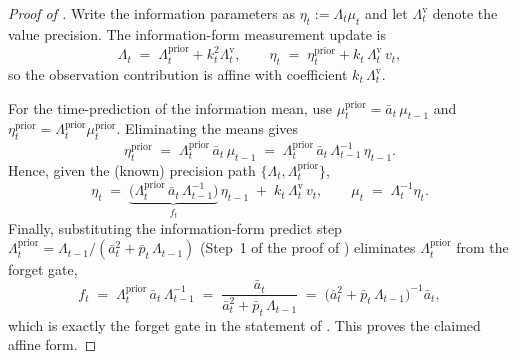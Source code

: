 \documentclass{article}
\begin{document}
\ThMeanAffine*
\begin{mdframed}
\begin{proof}[Proof of ]
Write the information parameters as $\eta_t := \Lambda_t \mu_t$ and let
$\Lambda_t^{\mathrm{v}}$ denote the value precision. The information-form measurement update is
\[
\Lambda_t \;=\; \Lambda_t^{\mathrm{prior}} + k_t^2 \Lambda_t^{\mathrm{v}},
\qquad
\eta_t \;=\; \eta_t^{\mathrm{prior}} + k_t\,\Lambda_t^{\mathrm{v}}\,v_t,
\]
so the observation contribution is affine with coefficient $k_t\,\Lambda_t^{\mathrm{v}}$.

For the time-prediction of the information mean, use $\mu_t^{\mathrm{prior}} = \bar{a}_t\,\mu_{t-1}$ and
$\eta_t^{\mathrm{prior}} = \Lambda_t^{\mathrm{prior}} \mu_t^{\mathrm{prior}}$. Eliminating the means gives
\[
\eta_t^{\mathrm{prior}} \;=\; \Lambda_t^{\mathrm{prior}}\, \bar{a}_t\, \mu_{t-1}
\;=\; \Lambda_t^{\mathrm{prior}}\, \bar{a}_t\, \Lambda_{t-1}^{-1}\,\eta_{t-1}.
\]
Hence, given the (known) precision path $\{\Lambda_t, \Lambda_t^{\mathrm{prior}}\}$,
\[
\eta_t \;=\; \underbrace{\bigl(\Lambda_t^{\mathrm{prior}}\, \bar{a}_t\, \Lambda_{t-1}^{-1}\bigr)}_{\displaystyle f_t}\,\eta_{t-1}
\;+\; k_t\,\Lambda_t^{\mathrm{v}}\,v_t,
\qquad
\mu_t \;=\; \Lambda_t^{-1}\eta_t.
\]
Finally, substituting the information-form predict step
$\Lambda_t^{\mathrm{prior}} = \Lambda_{t-1}/(\bar{a}_t^2 + \bar{p}_t\,\Lambda_{t-1})$ (Step~1 of the proof of ) eliminates
$\Lambda_t^{\mathrm{prior}}$ from the forget gate,
\[
f_t \;=\; \Lambda_t^{\mathrm{prior}}\, \bar{a}_t\, \Lambda_{t-1}^{-1}
\;=\; \frac{\bar{a}_t}{\bar{a}_t^2 + \bar{p}_t\,\Lambda_{t-1}}
\;=\; \bigl(\bar{a}_t^2 + \bar{p}_t\,\Lambda_{t-1}\bigr)^{-1} \bar{a}_t,
\]
which is exactly the forget gate in the statement of . This proves the claimed affine form.
\end{proof}
\end{mdframed}

\CorMomentForm*
\end{document}
